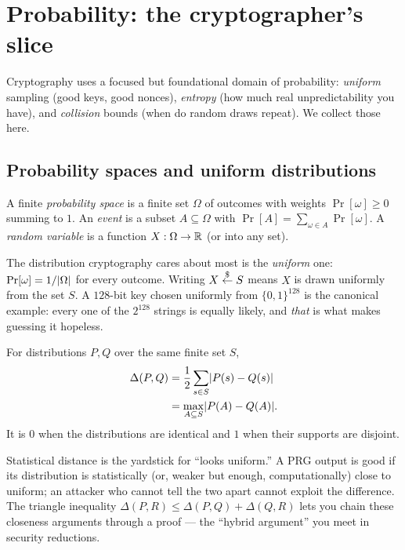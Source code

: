 \section{Probability: the cryptographer's slice}
\label{ch41:prob}

Cryptography uses a focused but foundational domain of probability: \emph{uniform}
sampling (good keys, good nonces), \emph{entropy} (how much real
unpredictability you have), and \emph{collision} bounds (when do random draws
repeat). We collect those here.

\subsection{Probability spaces and uniform distributions}
\label{ch41:uniform}

A finite \emph{probability space} is a finite set $\Omega$ of outcomes with weights
$\Pr[\omega]\ge 0$ summing to $1$. An \emph{event} is a subset $A\subseteq\Omega$
with $\Pr[A]=\sum_{\omega\in A}\Pr[\omega]$. A \emph{random variable} is a function
$X:\Omega\to\mathbb{R}$ (or into any set).

The distribution cryptography cares about most is the \emph{uniform} one:
$\Pr[\omega]=1/\lvert\Omega\rvert$ for every outcome. Writing $X\stackrel{\$}{\gets} S$ means $X$ is
drawn uniformly from the set $S$. A $128$-bit key chosen uniformly from
$\{0,1\}^{128}$ is the canonical example: every one of the $2^{128}$ strings is
equally likely, and \emph{that} is what makes guessing it hopeless.

\begin{definition}
\label{ch41:def-sd}
For distributions $P,Q$ over the same finite set $S$,
\begin{align*}
\Delta(P,Q) &= \frac{1}{2} \sum_{s\in S}\lvert P(s)-Q(s)\rvert \\
            &= \max_{A\subseteq S}\lvert P(A)-Q(A)\rvert.
\end{align*}
It is $0$ when the distributions are identical and $1$ when their supports are
disjoint.
\end{definition}

Statistical distance is the yardstick for ``looks uniform.'' A PRG output is good
if its distribution is statistically (or, weaker but enough, computationally) close
to uniform; an attacker who cannot tell the two apart cannot exploit the
difference. The triangle inequality $\Delta(P,R)\le \Delta(P,Q)+\Delta(Q,R)$ lets
you chain these closeness arguments through a proof --- the ``hybrid argument'' you
meet in security reductions.

